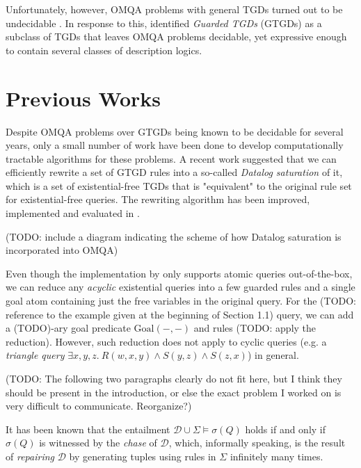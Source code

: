 \documentclass[12pt]{report}
\theoremstyle{plain}
\theoremstyle{definition}
\begin{document}
Unfortunately, however, OMQA problems with general TGDs turned out to be undecidable \cite{beeri_vardi_1981}. In response to this, \cite{cali_gottlob_kifer_2013} identified \emph{Guarded TGDs} (GTGDs) as a subclass of TGDs that leaves OMQA problems decidable, yet expressive enough to contain several classes of description logics.

\section{Previous Works}

Despite OMQA problems over GTGDs being known to be decidable for several years, only a small number of work have been done to develop computationally tractable algorithms for these problems. A recent work \cite{kappelmann_2019} suggested that we can efficiently rewrite a set of GTGD rules into a so-called \emph{Datalog saturation} of it, which is a set of existential-free TGDs that is "equivalent" to the original rule set for existential-free queries. The rewriting algorithm has been improved, implemented and evaluated in \cite{benedikt_buron_germano_kappelmann_motik_2022}. 

(TODO: include a diagram indicating the scheme of how Datalog saturation is incorporated into OMQA)

Even though the implementation by \cite{benedikt_buron_germano_kappelmann_motik_2022} only supports atomic queries out-of-the-box, we can reduce any \emph{acyclic} existential queries into a few guarded rules and a single goal atom containing just the free variables in the original query. For the (TODO: reference to the example given at the beginning of Section 1.1) query, we can add a (TODO)-ary goal predicate $\mathrm{Goal}(-, -)$ and rules (TODO: apply the reduction). However, such reduction does not apply to cyclic queries (e.g. a \emph{triangle query} $\exists x,y,z.\ R(w, x, y) \land S(y, z) \land S(z, x)$) in general.

(TODO: The following two paragraphs clearly do not fit here, but I think they should be present in the introduction, or else the exact problem I worked on is very difficult to communicate. Reorganize?)

It has been known that the entailment $\mathcal{D} \cup \Sigma \models \sigma(Q)$ holds if and only if $\sigma(Q)$ is witnessed by the \emph{chase} of $\mathcal{D}$, which, informally speaking, is the result of \emph{repairing} $\mathcal{D}$ by generating tuples using rules in $\Sigma$ infinitely many times. %
\end{document}
